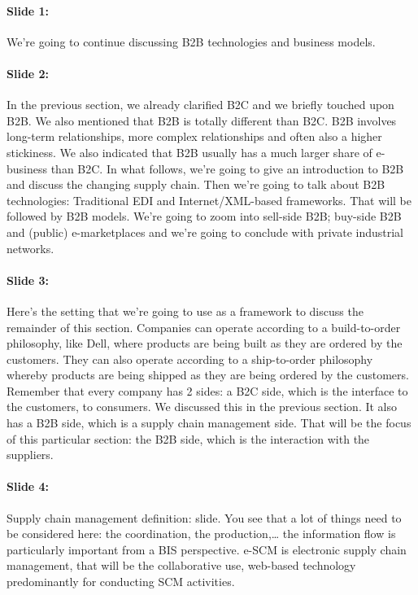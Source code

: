 \documentclass[10pt,a4paper]{report}
\begin{document}
\paragraph{Slide 1:}We're going to continue discussing B2B technologies and business models.

\paragraph{Slide 2:}In the previous section, we already clarified B2C and we briefly touched upon B2B. We also mentioned that B2B is totally different than B2C. B2B involves long-term relationships, more complex relationships and often also a higher stickiness. We also indicated that B2B usually has a much larger share of e-business than B2C. In what follows, we're going to give an introduction to B2B and discuss the changing supply chain. Then we're going to talk about B2B technologies: Traditional EDI and Internet/XML-based frameworks. That will be followed by B2B models. We're going to zoom into sell-side B2B; buy-side B2B and (public) e-marketplaces and we're going to conclude with private industrial networks.

\paragraph{Slide 3:}Here's the setting that we're going to use as a framework to discuss the remainder of this section. Companies can operate according to a build-to-order philosophy, like Dell, where products are being built as they are ordered by the customers. They can also operate according to a ship-to-order philosophy whereby products are being shipped as they are being ordered by the customers. Remember that every company has 2 sides: a B2C side, which is the interface to the customers, to consumers. We discussed this in the previous section. It also has a B2B side, which is a supply chain management side. That will be the focus of this particular section: the B2B side, which is the interaction with the suppliers.

\paragraph{Slide 4:}Supply chain management definition: slide. You see that a lot of things need to be considered here: the coordination, the production,… the information flow is particularly important from a BIS perspective. e-SCM is electronic supply chain management, that will be the collaborative use, web-based technology predominantly for conducting SCM activities.
\end{document}
